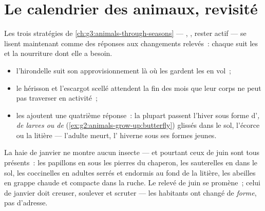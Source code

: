 \section{Le calendrier des animaux, revisité}

\begin{proposition}\label{prop:g6:life-through-seasons:animals}
Les trois stratégies de \cref{ch:g3:animals-through-seasons} ---
, , rester actif --- se lisent maintenant comme des
réponses aux changements relevés~: chaque  suit les 
et la nourriture dont elle a besoin.
\begin{itemize}
  \item l'hirondelle suit son approvisionnement là où les
         gardent les  en vol~;
  \item le hérisson et l'escargot scellé attendent la fin des mois
        que leur corps ne peut pas traverser en activité~;
  \item les  ajoutent une quatrième réponse~: la plupart
        passent l'hiver sous forme d'\emph{, de larves ou de
        } (\cref{ex:g2:animals-grow-up:butterfly})
        glissés dans le sol, l'écorce ou la litière --- l'adulte
        meurt, l' hiverne sous ses formes jeunes.
\end{itemize}
\end{proposition}
\admitted

\begin{example}\label{ex:g6:life-through-seasons:insects}
La haie de janvier ne montre aucun insecte --- et pourtant ceux de
juin sont tous présents~: les papillons en  sous les
pierres du chaperon, les sauterelles en  dans le sol, les
coccinelles en adultes serrés et endormis au fond de la litière, les
abeilles en grappe chaude et compacte dans la ruche. Le relevé de
juin se promène~; celui de janvier doit creuser, soulever et scruter
--- les habitants ont changé de \emph{forme}, pas d'adresse.
\end{example}

